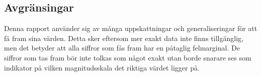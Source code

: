 \subsection{Avgränsingar}
\label{subsec:joel_a-delimitations}
Denna rapport använder sig av många uppskattningar och generaliseringar för att få fram sina värden. Detta sker eftersom mer exakt data inte finns tillgänglig, men det betyder att alla siffror som fås fram har en påtaglig felmarginal. De siffror som tas fram bör inte tolkas som något exakt utan borde snarare ses som indikator på vilken magnitudsskala det riktiga värdet ligger på.